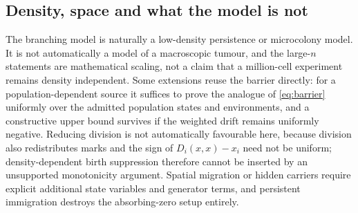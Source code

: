 \subsection{Density, space and what the model is not}

The branching model is naturally a low-density persistence or microcolony
model. It is not automatically a model of a macroscopic tumour, and the
large-$n$ statements are mathematical scaling, not a claim that a
million-cell experiment remains density independent. Some extensions reuse the
barrier directly: for a population-dependent source it suffices to prove the
analogue of \eqref{eq:barrier} uniformly over the admitted population states and
environments, and a constructive upper bound survives if the weighted drift
remains uniformly negative. Reducing division is not automatically favourable
here, because division also redistributes marks and the sign of
$D_i(x,x)-x_i$ need not be uniform; density-dependent birth suppression
therefore cannot be inserted by an unsupported monotonicity argument. Spatial
migration or hidden carriers require explicit additional state variables and
generator terms, and persistent immigration destroys the absorbing-zero setup
entirely.
